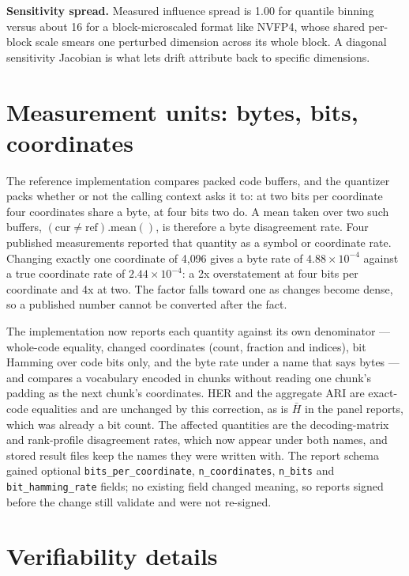 \documentclass{article}
\begin{document}
\textbf{Sensitivity spread.} Measured influence spread is 1.00 for quantile binning versus about 16 for a block-microscaled format like NVFP4, whose shared per-block scale smears one perturbed dimension across its whole block. A diagonal sensitivity Jacobian is what lets drift attribute back to specific dimensions.

\section{Measurement units: bytes, bits, coordinates}\label{app:units}

The reference implementation compares packed code buffers, and the quantizer packs whether or not the calling context asks it to: at two bits per coordinate four coordinates share a byte, at four bits two do. A mean taken over two such buffers, $(\text{cur}\neq\text{ref}).\text{mean}()$, is therefore a byte disagreement rate. Four published measurements reported that quantity as a symbol or coordinate rate. Changing exactly one coordinate of 4{,}096 gives a byte rate of $4.88\times10^{-4}$ against a true coordinate rate of $2.44\times10^{-4}$: a 2x overstatement at four bits per coordinate and 4x at two. The factor falls toward one as changes become dense, so a published number cannot be converted after the fact.

The implementation now reports each quantity against its own denominator --- whole-code equality, changed coordinates (count, fraction and indices), bit Hamming over code bits only, and the byte rate under a name that says bytes --- and compares a vocabulary encoded in chunks without reading one chunk's padding as the next chunk's coordinates. HER and the aggregate ARI are exact-code equalities and are unchanged by this correction, as is $\bar H$ in the panel reports, which was already a bit count. The affected quantities are the decoding-matrix and rank-profile disagreement rates, which now appear under both names, and stored result files keep the names they were written with. The report schema gained optional \texttt{bits\_per\_coordinate}, \texttt{n\_coordinates}, \texttt{n\_bits} and \texttt{bit\_hamming\_rate} fields; no existing field changed meaning, so reports signed before the change still validate and were not re-signed.

\section{Verifiability details}\label{app:verif}
\end{document}
